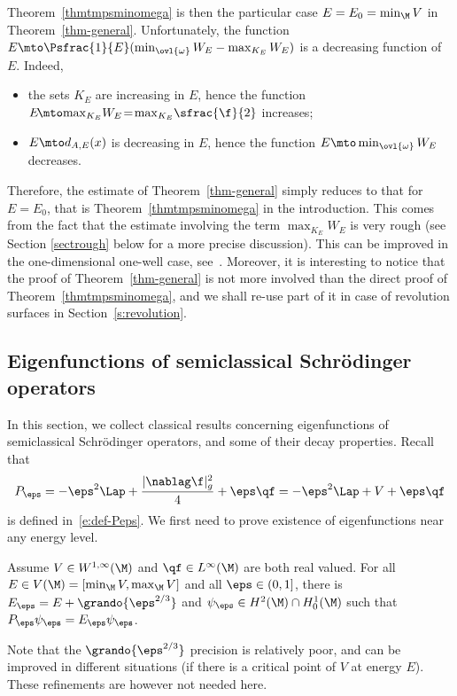 Theorem~\ref{thmtmpsminomega} is then the particular case $E=E_0=\min_\M V$ in Theorem~\ref{thm-general}.
Unfortunately, the function $E \mto \Psfrac{1}{E}(\min_{\ovl{\omega}}W_E - \max_{K_E} W_E)$ is a decreasing function of $E$. Indeed,
\begin{itemize}
\item the sets $K_E$ are increasing in $E$, hence the function $E\!\mto\! \max_{K_E} \!W_E\!=\! \max_{K_E} \!\sfrac{\f}{2}$ increases;
\item $E \mto d_{A,E}(x)$ is decreasing in $E$, hence the function $E \mto\min_{\ovl{\omega}}W_E$ decreases.
\end{itemize}
Therefore, the estimate of Theorem~\ref{thm-general} simply reduces to that for $E=E_0$, that is Theorem~\ref{thmtmpsminomega} in the introduction.
This comes from the fact that the estimate involving the term $\max_{K_E} W_E$ is very rough (see Section \ref{sectrough} below for a more precise discussion). This can be improved in the one-dimensional one-well case, see~\cite{LL:20-1D}.
Moreover, it is interesting to notice that the proof of Theorem~\ref{thm-general} is not more involved than the direct proof of Theorem~\ref{thmtmpsminomega}, and we shall re-use part of it in case of revolution surfaces in Section~\ref{s:revolution}.

\subsection{Eigenfunctions of semiclassical Schrödinger operators}
\label{s:sub-eig-schro}
In this section, we collect classical results concerning eigenfunctions of semiclassical Schrödinger operators, and some of their decay properties.
Recall that
\[
P_\eps = - \eps^2 \Lap + \frac{|\nablag \f|_g^2}{4} + \eps \qf = - \eps^2 \Lap + V+ \eps \qf
\]
is defined in~\eqref{e:def-Peps}.
We first need to prove existence of eigenfunctions near any energy level.
\begin{lemma}
\label{l:exist-eig}
Assume $V \in W^{1,\infty}(\M)$ and $\qf \in L^\infty(\M)$ are both real valued.
For all $E \in V(\M) = [\min_\M V, \max_\M V]$ and all $\eps \in (0,1]$, there is $E_\eps = E + \grando{\eps^{2/3}}$ and $\psi_\eps \in H^2(\M) \cap H^1_0(\M)$ such that $P_\eps \psi_\eps = E_\eps \psi_\eps$.
\end{lemma}
Note that the $\grando{\eps^{2/3}}$ precision is relatively poor, and can be improved in different situations (\eg if there is a critical point of $V$ at energy $E$). These refinements are however not needed here.


